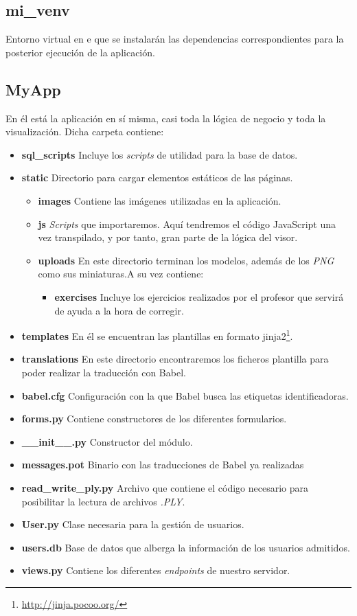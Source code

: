 \subsection{mi\_venv}
Entorno virtual en e que se instalarán las dependencias correspondientes para la posterior ejecución de la aplicación.

\subsection{MyApp}
En él está la aplicación en sí misma, casi toda la lógica de negocio y toda la visualización. Dicha carpeta contiene:
\begin{itemize}
	\item \textbf{sql\_scripts} Incluye los \textit{scripts} de utilidad para la base de datos.
	\item \textbf{static} Directorio para cargar elementos estáticos de las páginas.
	\begin{itemize}
		\item \textbf{images} Contiene las imágenes utilizadas en la aplicación.
		\item \textbf{js} \textit{Scripts} que importaremos. Aquí tendremos el código JavaScript una vez transpilado, y por tanto, gran parte de la lógica del visor.
		\item \textbf{uploads} En este directorio terminan los modelos, además de los \textit{PNG} como sus miniaturas.A su vez contiene:
		\begin{itemize}
			\item \textbf{exercises} Incluye los ejercicios realizados por el profesor que servirá de ayuda a la hora de corregir.
		\end{itemize}
	\end{itemize}
	\item \textbf{templates} En él se encuentran las plantillas en formato jinja2\footnote{\url{http://jinja.pocoo.org/}}.
	\item \textbf{translations} En este directorio encontraremos los ficheros plantilla para poder realizar la traducción con Babel.
	\item \textbf{babel.cfg} Configuración con la que Babel busca las etiquetas identificadoras.
	\item \textbf{forms.py} Contiene constructores de los diferentes formularios.
	\item \textbf{\_\_init\_\_.py} Constructor del módulo.
	\item \textbf{messages.pot} Binario con las traducciones de Babel ya realizadas
	\item \textbf{read\_write\_ply.py} Archivo que contiene el código necesario para posibilitar la lectura de archivos \textit{.PLY}.
	\item \textbf{User.py} Clase necesaria para la gestión de usuarios.
	\item \textbf{users.db} Base de datos que alberga la información de los usuarios admitidos.
	\item \textbf{views.py} Contiene los diferentes \textit{endpoints} de nuestro servidor.
\end{itemize}

